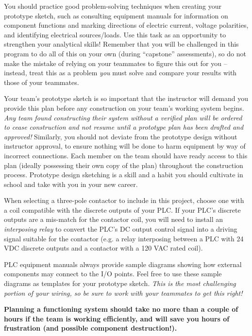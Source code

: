 \begin{itemize}
You should practice good problem-solving techniques when creating your prototype sketch, such as consulting equipment manuals for information on component functions and marking directions of electric current, voltage polarities, and identifying electrical sources/loads.  Use this task as an opportunity to strengthen your analytical skills!  Remember that you will be challenged in this program to do all of this on your own (during ``capstone'' assessments), so do not make the mistake of relying on your teammates to figure this out for you -- instead, treat this as a problem {\it you} must solve and compare your results with those of your teammates.

Your team's prototype sketch is so important that the instructor will demand you provide this plan before any construction on your team's working system begins.  {\it Any team found constructing their system without a verified plan will be ordered to cease construction and not resume until a prototype plan has been drafted and approved!}  Similarly, you should not deviate from the prototype design without instructor approval, to ensure nothing will be done to harm equipment by way of incorrect connections.  Each member on the team should have ready access to this plan (ideally possessing their own copy of the plan) throughout the construction process.  Prototype design sketching is a skill and a habit you should cultivate in school and take with you in your new career.

\vskip 10pt

When selecting a three-pole contactor to include in this project, choose one with a coil compatible with the discrete outputs of your PLC.  If your PLC's discrete outputs are a mis-match for the contactor coil, you will need to install an {\it interposing relay} to convert the PLC's DC output control signal into a driving signal suitable for the contactor (e.g. a relay interposing between a PLC with 24 VDC discrete outputs and a contactor with a 120 VAC rated coil).

PLC equipment manuals always provide sample diagrams showing how external components may connect to the I/O points.  Feel free to use these sample diagrams as templates for your prototype sketch.  {\it This is the most challenging portion of your wiring, so be sure to work with your teammates to get this right!}

\vskip 10pt

{\bf Planning a functioning system should take no more than a couple of hours if the team is working efficiently, and will save you hours of frustration (and possible component destruction!).}









\end{itemize}
